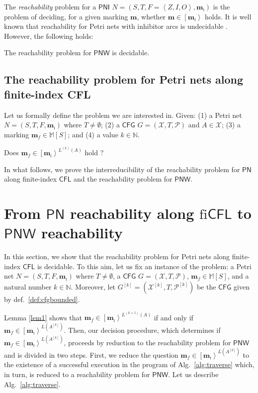 \documentclass{fsttcs}
\def\tuple#1{{\left\langle #1 \right\rangle}}
\def\nats{{\mathbb{N}}}
\newcommand{\multiset}[1]{{\mathbb{M}[ #1 ]}}
\def\mmap{\mathbf{m}}
\newcommand{\fire}[1]{\left[ {#1}\right\rangle}
\def\prod{\mathcal{P}}
\def\cfl{\mathsf{CFL}}
\def\cfg{\mathsf{CFG}}
\def\pn{\mathsf{PN}}
\def\pni{\mathsf{PNI}}
\def\pnw{\mathsf{PNW}}
\begin{document}
The {\em reachability} problem for a \(\pni\) $N=(S,T,F=\tuple{Z,I,O},\mmap_{\imath})$ is the problem of deciding, for a given marking  $\mmap$, whether \(\mmap\in\fire{\mmap_{\imath}}\) holds. It is well known that reachability  for Petri nets with inhibitor arcs is  undecidable \cite{hack76}. However, the following holds:

\begin{theorem}{\cite{Reinhardt}}
	The reachability problem for \(\pnw\) is decidable.
	\label{thm:reinhardt}
\end{theorem}

\subsection{The reachability problem for Petri nets along finite-index CFL}

Let us formally define the problem we are interested in.  Given: (1) a Petri net \(N=(S,T,F,\mmap_{\imath})\) where \(T\neq\emptyset\); 
	(2) a \(\cfg\) \(G=(\mathcal{X},T,\prod)\) and \(A\in\mathcal{X}\); (3) a marking \(\mmap_f\in\multiset{S}\);
	and (4) a value \(k\in\nats\).

\noindent
\hspace{0pt}Does \(\mmap_f\in\fire{\mmap_{\imath}}^{L^{(k)}(A)}\)
hold ?\hfill\vspace{0pt}





In what follows, we prove the interreducibility of the reachability
problem for \(\pn\) along finite-index \(\cfl\) and the reachability
problem for \(\pnw\).
 \section{From \(\pn\) reachability along \(\text{fi}\cfl\) to \(\pnw\) reachability}\label{sec:reduc_pierre}

In this section, we show that the reachability problem for Petri nets along
finite-index \(\cfl\)  is decidable. To this aim, let us fix an instance of the problem: a Petri net \(N=(S,T,F,\mmap_{\imath})\) where
\(T\neq\emptyset\),  a \(\cfg\) \(G=(\mathcal{X},T,\prod)\),
\(\mmap_f\in\multiset{S}\), and a natural number   \(k\in\nats\). Moreover, let
\(G^{[k]}=(\mathcal{X}^{[k]},T,\prod^{[k]})\) be the \(\cfg\)
given by def.~\ref{def:cfgbounded}. 
	
Lemma \ref{lem1} shows that \(\mmap_f\in\fire{\mmap_{\imath}}^{L^{(k+1)}(A)}\)
if and only if \(\mmap_f\in\fire{\mmap_{\imath}}^{L(A^{[k]})}\). Then, our decision
procedure, which determines if
\(\mmap_f\in\fire{\mmap_{\imath}}^{L(A^{[k]})}\), proceeds by reduction to the
reachability problem for \(\pnw\) and is divided in two steps.  First, we
reduce the question \(\mmap_f\in\fire{\mmap_{\imath}}^{L(A^{[k]})}\) to the
existence of a successful execution in the program of Alg.~\ref{alg:traverse}
which, in turn, is reduced to a reachability problem for \(\pnw\).
Let us describe Alg.~\ref{alg:traverse}.
\end{document}
